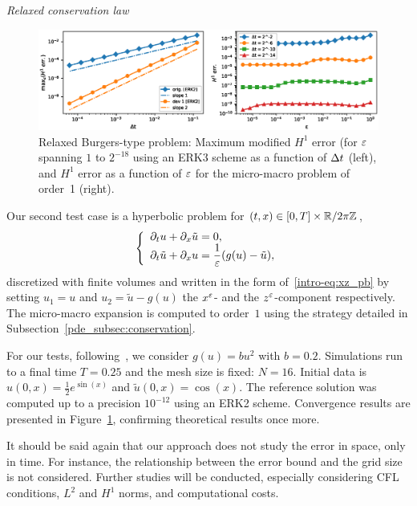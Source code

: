 \renewcommand{\Dx}{\Delta x}
\renewcommand{\rlxcont}{\tilde{u}}
\renewcommand{\rlxdisc}{\tilde{U}}
\renewcommand{\xvar}{U_1}
\renewcommand{\zvar}{U_2}
\medskip
\noindent\textit{Relaxed conservation law}\\
%
\begin{figure}
\centering
\includegraphics[width=\textwidth]{./miMa_Dissipatif/cv_hyperb_erk2.eps}
\vspace*{-24pt}
\caption{Relaxed Burgers-type problem: Maximum modified $H^1$ error (for $\varepsilon$ spanning $1$ to $2^{-18}$ using an ERK3 scheme as a function of $\Delta t$ (left), and $H^1$ error as a function of $\varepsilon$ for the micro-macro problem of order~1 (right).}
\label{test_fig:sqr_results}
\end{figure}%
%
Our second test case is a hyperbolic problem for $(t,x) \in [0,T] \times \mathbb{R}/2\pi \mathbb Z$, 
\begin{equation*} %
\left\{ \begin{array}{l}
\dpt u + \dpx \rlxcont = 0 , \\ \displaystyle
\dpt \rlxcont + \dpx u = \frac{1}{\eps}(g(u) - \rlxcont) ,
\end{array} \right .
\end{equation*}
discretized with finite volumes and written in the form of~\eqref{intro-eq:xz_pb} 
by setting $u_1 = u$ and $u_2 = \tilde{u} - g(u)$ 
the $x^{\varepsilon}$- and the $z^{\varepsilon}$-component respectively. 
The micro-macro expansion is computed to order~$1$ using the strategy detailed in Subsection~\ref{pde_subsec:conservation}. 

For our tests, following~\cite{hu.2021.uniform}, we consider 
$ g(u) = bu^2 $ 
with $b = 0.2$. 
Simulations run to a final time $T = 0.25$ and the mesh size is fixed: $N = 16$. 
Initial data is $u(0,x) = \frac{1}{2} e^{\sin(x)}$ and $\rlxcont(0,x) = \cos(x)$. 
The reference solution was computed up to a precision $10^{-12}$ using an ERK2 scheme. 
Convergence results are presented in Figure~\ref{test_fig:sqr_results}, 
confirming theoretical results once more. 

It should be said again that our approach does not study the error in space, only in time. 
For instance, the relationship between the error bound and the grid size is not considered. 
Further studies will be conducted, especially considering CFL conditions, $L^2$ and $H^1$ norms, and computational costs. 


